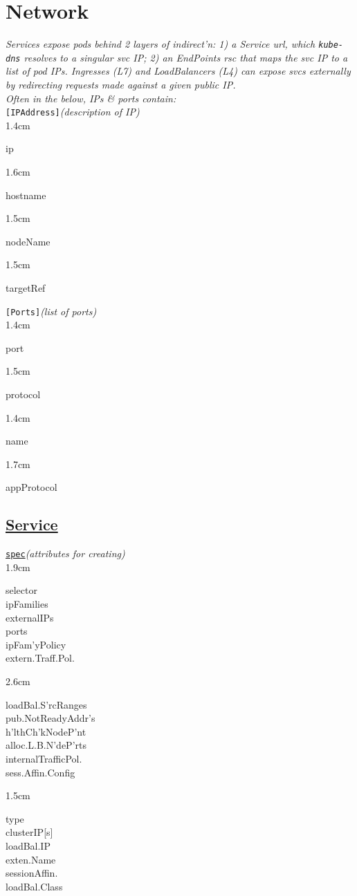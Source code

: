 \section{Network}

{\footnotesize \textit{Services expose pods behind 2 layers of indirect'n: 1) a Service url, which {\tt kube-dns} resolves to a singular svc IP; 2) an EndPoints rsc that maps the svc IP to a list of pod IPs. Ingresses (L7) and LoadBalancers (L4) can expose svcs externally by redirecting requests made against a given public IP.}}\\

\textit{Often in the below, IPs \& ports contain:}\\
\texttt{[IPAddress]}\quad\textit{(description of IP)}\\[-2mm]
\api
{1.4cm}{
ip

}
{1.6cm}{
hostname

}
{1.5cm}{
nodeName

}
{1.5cm}{
targetRef

}
\stopapi


\texttt{[Ports]}\quad\textit{(list of ports)}\\[-2mm]
\api
{1.4cm}{
port        

}
{1.5cm}{
protocol

}
{1.4cm}{
name

}
{1.7cm}{
appProtocol

}
\stopapi

\subsection*{\href{https://kubernetes.io/docs/concepts/services-networking/service/}{Service}}

\texttt{\href{https://kubernetes.io/docs/reference/kubernetes-api/service-resources/service-v1/}{spec}}\quad\textit{(attributes for creating)}\\[-2mm]
\api
{1.9cm}{
selector        \\
ipFamilies      \\
externalIPs     \\
ports           \\
ipFam'yPolicy   \\
extern.Traff.Pol.

}
{2.6cm}{
loadBal.S'rcRanges\\
pub.NotReadyAddr's\\
h'lthCh'kNodeP'nt\\
alloc.L.B.N'deP'rts\\
internalTrafficPol.\\
sess.Affin.Config

}
{1.5cm}{
type            \\
clusterIP[s]    \\
loadBal.IP      \\
exten.Name      \\
sessionAffin.   \\
loadBal.Class   

}
\stopapi


